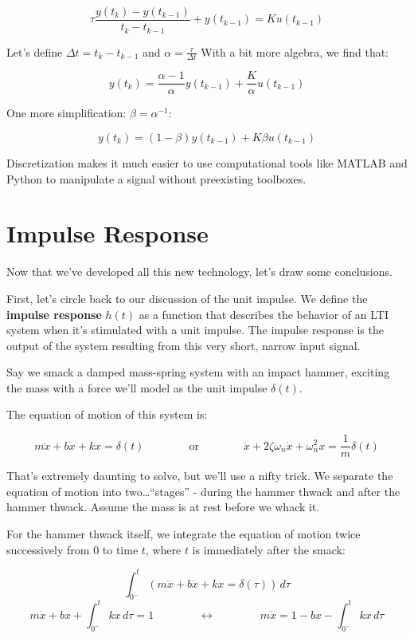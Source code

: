 \documentclass[
  letterpaper,
  DIV=11,
  numbers=noendperiod]{scrreprt}
\begin{document}
\[\tau \frac{y(t_k) - y(t_{k-1})}{t_k - t_{k-1}} + y(t_{k-1}) = Ku(t_{k-1})\]

Let's define \(\Delta t = t_k - t_{k-1}\) and
\(\alpha = \frac{\tau}{\Delta t}\) With a bit more algebra, we find
that:

\[y(t_k) = \frac{\alpha - 1}{\alpha} y(t_{k-1}) + \frac{K}{\alpha} u(t_{k-1})\]

One more simplification: \(\beta = \alpha^{-1}\):

\[y(t_k) = (1-\beta) y(t_{k-1}) + K \beta u(t_{k-1})\]

Discretization makes it much easier to use computational tools like
MATLAB and Python to manipulate a signal without preexisting toolboxes.

\noindent\makebox[\linewidth]{\rule{\paperwidth}{0.4pt}}

\hypertarget{impulse-response}{%
\section{Impulse Response}\label{impulse-response}}

Now that we've developed all this new technology, let's draw some
conclusions.

First, let's circle back to our discussion of the unit impulse. We
define the \textbf{impulse response} \(h(t)\) as a function that
describes the behavior of an LTI system when it's stimulated with a unit
impulse. The impulse response is the output of the system resulting from
this very short, narrow input signal.

Say we smack a damped mass-spring system with an impact hammer, exciting
the mass with a force we'll model as the unit impulse \(\delta(t)\).

The equation of motion of this system is:

\[m\ddot{x} + b \dot{x} + kx = \delta(t) \qquad \qquad \text{or} \qquad \qquad \ddot{x} + 2\zeta \omega_n \dot{x} + \omega_n^2 x = \frac{1}{m} \delta(t)\]

That's extremely daunting to solve, but we'll use a nifty trick. We
separate the equation of motion into two\ldots{}``stages'' - during the
hammer thwack and after the hammer thwack. Assume the mass is at rest
before we whack it.

For the hammer thwack itself, we integrate the equation of motion twice
successively from \(0\) to time \(t\), where \(t\) is immediately after
the smack:

\[\int_{0^-}^t \left(m \ddot{x} + b \dot{x} + kx = \delta(\tau) \right) \, d\tau\]
\[m \dot{x} + bx + \int_{0^-}^t kx \, d\tau = 1 \qquad \qquad \longleftrightarrow \qquad \qquad m \dot{x} = 1 - bx - \int_{0^-}^t kx \, d\tau\]
\end{document}
